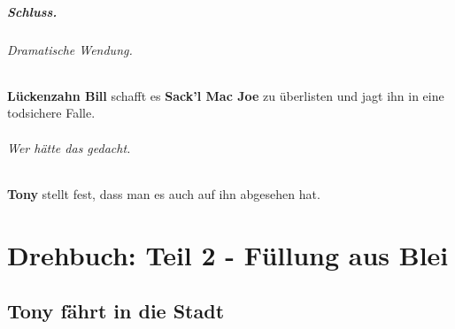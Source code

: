 \documentclass[10pt,a4paper,german]{book}
\begin{document}
\paragraph{Schluss.}
    \subparagraph{Dramatische Wendung.}
    \textbf{Lückenzahn Bill} schafft es \textbf{Sack'l Mac Joe} zu überlisten und jagt ihn in eine todsichere Falle.
    \subparagraph{Wer hätte das gedacht.}
    \textbf{Tony} stellt fest, dass man es auch auf ihn abgesehen hat.

%
%
\chapter{Drehbuch: Teil 2 - Füllung aus Blei}
\section{Tony fährt in die Stadt}
\end{document}
